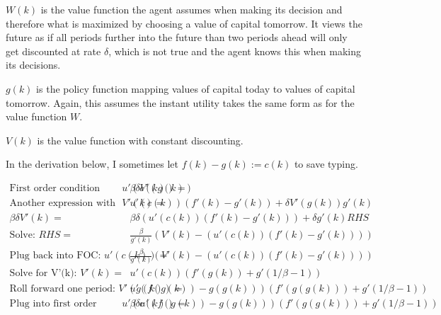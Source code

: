 \begin{questions}
\begin{solution}
	$W(k)$ is the value function the agent assumes when making its decision and therefore what is maximized by choosing a value of capital tomorrow. It views the future as if all periods further into the future than two periods ahead will only get discounted at rate $\delta$, which is not true and the agent knows this when making its decisions.

	$g(k)$ is the policy function mapping values of capital today to values of capital tomorrow. Again, this assumes the instant utility takes the same form as for the value function $W$.

	$V(k)$ is the value function with constant discounting. 

\end{solution}

\begin{solution}

In the derivation below, I sometimes let $f(k) - g(k) := c(k)$ to save typing.

	\begin{align}
		\text{First order condition gives: } u'\left(c(k)\right) =&  \beta \delta V'\left(g\left(k\right)\right)\\
		\text{Another expression with RHS: } V'(k)  =& u'\left(c(k)\right)\left(f'(k) - g'(k)\right) + \delta V'(g(k))g'(k) \\
		\beta \delta V'(k)  =& \beta \delta \left( u'\left(c(k) \right) \left(f'(k) - g'(k)\right)\right) + \delta g'(k) RHS \\
		\text{Solve:  }RHS  =&  \frac{\beta}{g'(k)}\left( V'(k) - \left(u'\left(c(k)\right)\left(f'(k) - g'(k)\right)\right) \right) \\
		\text{Plug back into FOC: } u'\left(c(k)\right)  =& \frac{\beta}{g'(k)} \left( V'(k) - \left(u'\left(c(k)\right)\left(f'(k) - g'(k)\right)\right) \right) \\
		\text{Solve for V'(k): }V'(k)  = & u'\left(c(k)\right)  \left( f'(g(k)) + g'\left( 1/\beta - 1\right) \right) \\
		\text{Roll forward one period: } V'(g(k)) =&  u'\left(f\left(g(k)\right)- g\left(g(k) \right)\right)  \left( f'(g(g(k))) + g'\left( 1/\beta - 1\right) \right) \\
		\text{Plug into first order condition: } u'\left(c(k)\right) =& \beta \delta u'\left(f\left(g(k)\right)- g\left(g(k) \right)\right)  \left( f'(g(g(k))) + g'\left( 1/\beta - 1\right) \right)
	\end{align}



\end{solution}
\end{questions}
